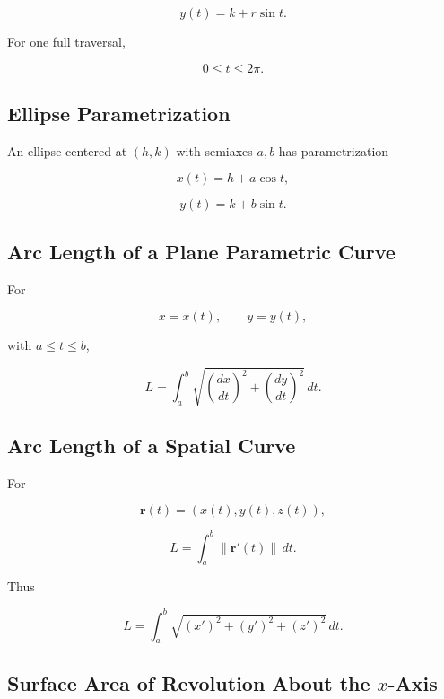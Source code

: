 \[
\boxed{
y(t)
=
k+r\sin t.
}
\]

For one full traversal,

\[
\boxed{
0\leq t\leq2\pi.
}
\]

\subsection{Ellipse Parametrization}
\label{subsec:ellipse-parametrization-reference}

An ellipse centered at \((h,k)\) with semiaxes \(a,b\) has parametrization

\[
\boxed{
x(t)
=
h+a\cos t,
}
\]

\[
\boxed{
y(t)
=
k+b\sin t.
}
\]

\subsection{Arc Length of a Plane Parametric Curve}
\label{subsec:parametric-arc-length-reference}

For

\[
x=x(t),
\qquad
y=y(t),
\]

with \(a\leq t\leq b\),

\[
\boxed{
L
=
\int_a^b
\sqrt{
\left(
\frac{dx}{dt}
\right)^2
+
\left(
\frac{dy}{dt}
\right)^2
}
\,dt.
}
\]

\subsection{Arc Length of a Spatial Curve}
\label{subsec:spatial-arc-length-reference}

For

\[
\mathbf{r}(t)
=
(x(t),y(t),z(t)),
\]

\[
\boxed{
L
=
\int_a^b
\|\mathbf{r}'(t)\|
\,dt.
}
\]

Thus

\[
\boxed{
L
=
\int_a^b
\sqrt{
(x')^2+(y')^2+(z')^2
}
\,dt.
}
\]

\subsection{Surface Area of Revolution About the \(x\)-Axis}
\label{subsec:surface-area-revolution-x}

